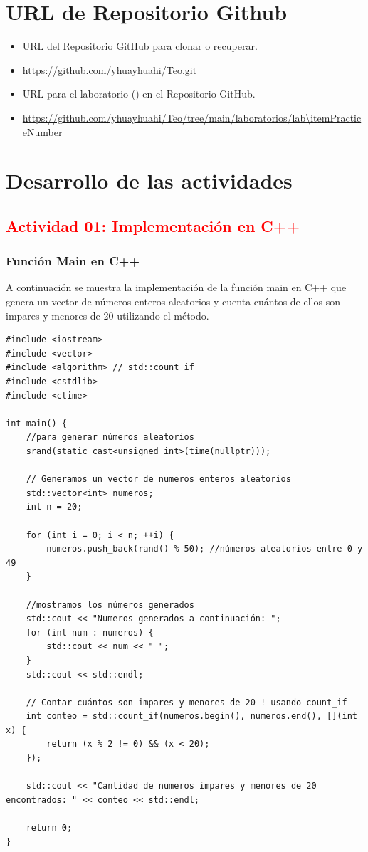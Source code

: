 \section{URL de Repositorio Github}

\begin{itemize}
    \item URL del Repositorio GitHub para clonar o recuperar.
    \item \url{https://github.com/yhuayhuahi/Teo.git}
    \item URL para el laboratorio (\itemPracticeNumber) en el Repositorio GitHub.
    \item \url{https://github.com/yhuayhuahi/Teo/tree/main/laboratorios/lab\itemPracticeNumber}
\end{itemize}




\section{Desarrollo de las actividades}

\subsection {\textcolor{red}{Actividad 01: Implementación en C++}}

\subsubsection {Función Main en C++}

A continuación se muestra la implementación de la función main en C++ que genera un vector de números enteros aleatorios y cuenta cuántos de ellos son impares y menores de 20 utilizando el método.

\begin{lstlisting}[style=cpp-style, caption={Función Main en cpp - Primera implementación}]
#include <iostream>
#include <vector>
#include <algorithm> // std::count_if
#include <cstdlib>   
#include <ctime>     

int main() {
    //para generar números aleatorios
    srand(static_cast<unsigned int>(time(nullptr)));

    // Generamos un vector de numeros enteros aleatorios
    std::vector<int> numeros;
    int n = 20;

    for (int i = 0; i < n; ++i) {
        numeros.push_back(rand() % 50); //números aleatorios entre 0 y 49
    }

    //mostramos los números generados
    std::cout << "Numeros generados a continuación: ";
    for (int num : numeros) {
        std::cout << num << " ";
    }
    std::cout << std::endl;

    // Contar cuántos son impares y menores de 20 ! usando count_if
    int conteo = std::count_if(numeros.begin(), numeros.end(), [](int x) {
        return (x % 2 != 0) && (x < 20);
    });

    std::cout << "Cantidad de numeros impares y menores de 20 encontrados: " << conteo << std::endl;

    return 0;
}
\end{lstlisting}



